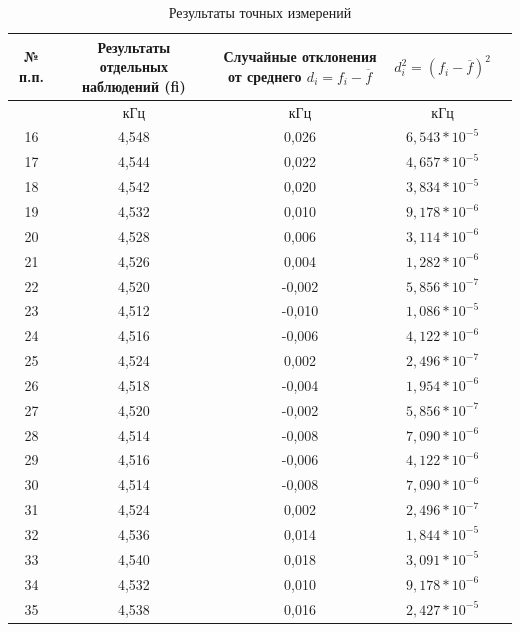 \begin{center}
\begin{table}[h!]
\centering
\caption{Результаты точных измерений}
\label{tabl:2}
\begin{tabular}{|c|c|c|c|c|}
\hline
\begin{minipage}{7mm}
    № п.п. 
\end{minipage}&
\begin{minipage}{5cm}
    Результаты отдельных наблюдений (fi)
\end{minipage} &
\begin{minipage}{5cm}
    Случайные отклонения от среднего $d_i = f_i - \overline{f}$
\end{minipage} &
\begin{minipage}{5cm}
     $d_i^2 = (f_i - \overline{f})^2$
\end{minipage}\\
\hline
{}&кГц&кГц&кГц\\
\hline
16 & 4,548 & 0,026 & $6,543*10^{-5}$ \\
17 & 4,544 & 0,022 & $4,657*10^{-5}$ \\
18 & 4,542 & 0,020 & $3,834*10^{-5}$ \\
19 & 4,532 & 0,010 & $9,178*10^{-6}$ \\
20 & 4,528 & 0,006 & $3,114*10^{-6}$ \\
21 & 4,526 & 0,004 & $1,282*10^{-6}$ \\
22 & 4,520 & -0,002 & $5,856*10^{-7}$ \\
23 & 4,512 & -0,010 & $1,086*10^{-5}$ \\
24 & 4,516 & -0,006 & $4,122*10^{-6}$ \\
25 & 4,524 & 0,002 & $2,496*10^{-7}$ \\
26 & 4,518 & -0,004 & $1,954*10^{-6}$ \\
27 & 4,520 & -0,002 & $5,856*10^{-7}$ \\
28 & 4,514 & -0,008 & $7,090*10^{-6}$ \\
29 & 4,516 & -0,006 & $4,122*10^{-6}$ \\
30 & 4,514 & -0,008 & $7,090*10^{-6}$ \\
31 & 4,524 & 0,002 & $2,496*10^{-7}$ \\
32 & 4,536 & 0,014 & $1,844*10^{-5}$ \\
33 & 4,540 & 0,018 & $3,091*10^{-5}$ \\
34 & 4,532 & 0,010 & $9,178*10^{-6}$ \\
35 & 4,538 & 0,016 & $2,427*10^{-5}$ \\

\end{tabular}
\end{table}
\end{center}
